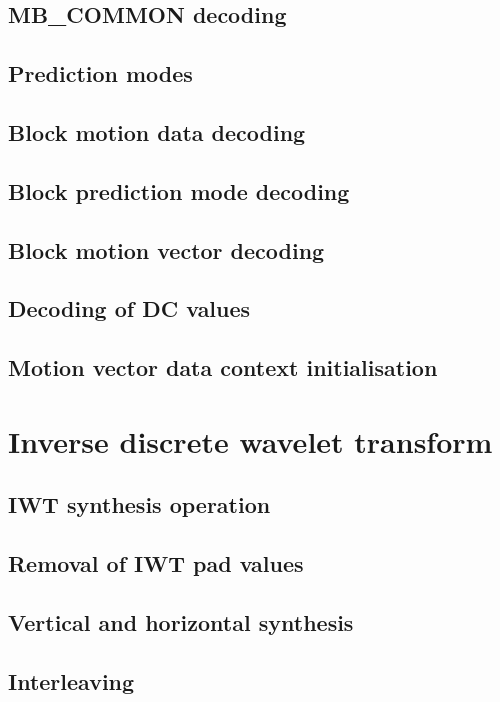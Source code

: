 \subsection{MB\_COMMON decoding}
\subsection{Prediction modes}
\subsection{Block motion data decoding}
\subsection{Block prediction mode decoding}
\subsection{Block motion vector decoding}
\subsection{Decoding of DC values}
\subsection{Motion vector data context initialisation}


\clearpage
\section{Inverse discrete wavelet transform}
\subsection{IWT synthesis operation}
\subsection{Removal of IWT pad values}
\subsection{Vertical and horizontal synthesis}
\subsection{Interleaving}
